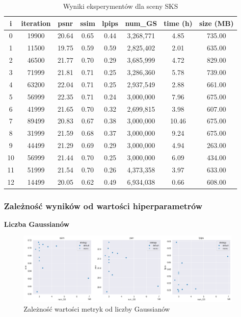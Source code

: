 \begin{table}[!h]
    \centering
    \begin{tabular}{|c|c|c|c|c|c|c|c|}
    \hline
    i & iteration & psnr & ssim & lpips & num\_GS & time (h) & size (MB) \\
    \hline
    0 & 19900 & 20.64 & 0.65 & 0.44 & 3,268,771 & 4.85 & 735.00 \\
    \hline
    1 & 11500 & 19.75 & 0.59 & 0.59 & 2,825,402 & 2.01 & 635.00 \\
    \hline
    2 & 46500 & 21.77 & 0.70 & 0.29 & 3,685,999 & 4.72 & 829.00 \\
    \hline
    3 & 71999 & 21.81 & 0.71 & 0.25 & 3,286,360 & 5.78 & 739.00 \\
    \hline
    4 & 63200 & 22.04 & 0.71 & 0.25 & 2,937,549 & 2.88 & 661.00 \\
    \hline
    5 & 56999 & 22.35 & 0.71 & 0.24 & 3,000,000 & 7.96 & 675.00 \\
    \hline
    6 & 41999 & 21.65 & 0.70 & 0.32 & 2,699,815 & 3.98 & 607.00 \\
    \hline
    7 & 89499 & 20.83 & 0.67 & 0.38 & 3,000,000 & 10.46 & 675.00 \\
    \hline
    8 & 31999 & 21.59 & 0.68 & 0.37 & 3,000,000 & 9.24 & 675.00 \\
    \hline
    9 & 44499 & 21.29 & 0.69 & 0.29 & 3,000,000 & 4.94 & 263.00 \\
    \hline
    10 & 56999 & 21.44 & 0.70 & 0.25 & 3,000,000 & 6.09 & 434.00 \\
    \hline
    11 & 51999 & 21.54 & 0.70 & 0.26 & 4,373,358 & 3.97 & 633.00 \\
    \hline
    12 & 14499 & 20.05 & 0.62 & 0.49 & 6,934,038 & 0.66 & 608.00 \\
    \hline
    \end{tabular}
    \caption{Wyniki eksperymentów dla sceny SKS}
    \label{table:tab_res_sks}
\end{table}

\pagebreak

\subsubsection{Zależność wyników od wartości hiperparametrów}

\textbf{Liczba Gaussianów}

\begin{figure}[!h]
    \includegraphics[width=\linewidth]{img/numGS_metrics.png}
    \caption{Zależność wartości metryk od liczby Gaussianów}
    \label{fig:metrics_1}
\end{figure}

